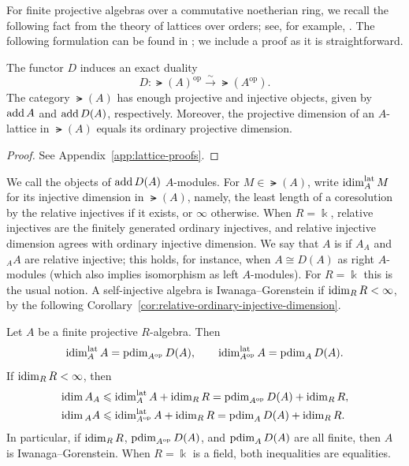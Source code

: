 \documentclass[a4paper,leqno]{amsart}
\begin{document}
For finite projective algebras over a commutative noetherian ring, we recall the following fact from the theory of lattices over orders; see, for example, \cite[Section~25]{CR81}.
The following formulation can be found in \cite[Section~2]{BBIKP25}; we include a proof as it is straightforward.

\begin{lem}\label{lem:lattice-canonical-duality}
The functor $D$ induces an exact duality
\[
 D:\lat(A)^{\operatorname{op}}
 \xrightarrow{\sim}\lat(A^{\operatorname{op}}).
\]
The category $\lat(A)$ has enough projective and injective objects, given by $\operatorname{add} A$ and $\operatorname{add} D(A)$, respectively. Moreover, the projective dimension of an $A$-lattice in $\lat(A)$ equals its ordinary projective dimension.
\end{lem}

\begin{proof}
See Appendix~\ref{app:lattice-proofs}.
\end{proof}

We call the objects of $\operatorname{add} D(A)$  $A$-modules. For $M\in\lat(A)$, write $\operatorname{idim}^{\operatorname{lat}}_A M$ for its injective dimension in $\lat(A)$, namely, the least length of a coresolution by the relative injectives if it exists, or $\infty$ otherwise. When $R=\Bbbk$, relative injectives are the finitely generated ordinary injectives, and relative injective dimension agrees with ordinary injective dimension.
We say that $A$ is  if $A_A$ and ${}_AA$ are relative injective; this holds, for instance, when $A\cong D(A)$ as right $A$-modules (which also implies isomorphism as left $A$-modules). For $R=\Bbbk$ this is the usual notion.  A self-injective algebra is Iwanaga--Gorenstein if $\operatorname{idim}_RR<\infty$, by the following Corollary~\ref{cor:relative-ordinary-injective-dimension}.

\begin{cor}\label{cor:relative-ordinary-injective-dimension}
Let $A$ be a finite projective $R$-algebra. Then
\[
 \operatorname{idim}^{\operatorname{lat}}_A A
 =\operatorname{pdim}_{A^{\operatorname{op}}}D(A),
 \qquad
 \operatorname{idim}^{\operatorname{lat}}_{A^{\operatorname{op}}}A
 =\operatorname{pdim}_A D(A).
\]
If $\operatorname{idim}_R R<\infty$, then
\[
\begin{aligned}
 \operatorname{idim} A_A
 &\leqslant \operatorname{idim}^{\operatorname{lat}}_A A+\operatorname{idim}_R R
 =\operatorname{pdim}_{A^{\operatorname{op}}}D(A)+\operatorname{idim}_R R,\\
 \operatorname{idim} {}_A A
 &\leqslant \operatorname{idim}^{\operatorname{lat}}_{A^{\operatorname{op}}}A+\operatorname{idim}_R R
 =\operatorname{pdim}_A D(A)+\operatorname{idim}_R R.
\end{aligned}
\]
In particular, if $\operatorname{idim}_R R$, $\operatorname{pdim}_{A^{\operatorname{op}}}D(A)$, and $\operatorname{pdim}_{A}D(A)$ are all finite, then $A$ is Iwanaga--Gorenstein. 
When $R=\Bbbk$ is a field, both inequalities are equalities.
\end{cor}
\end{document}
